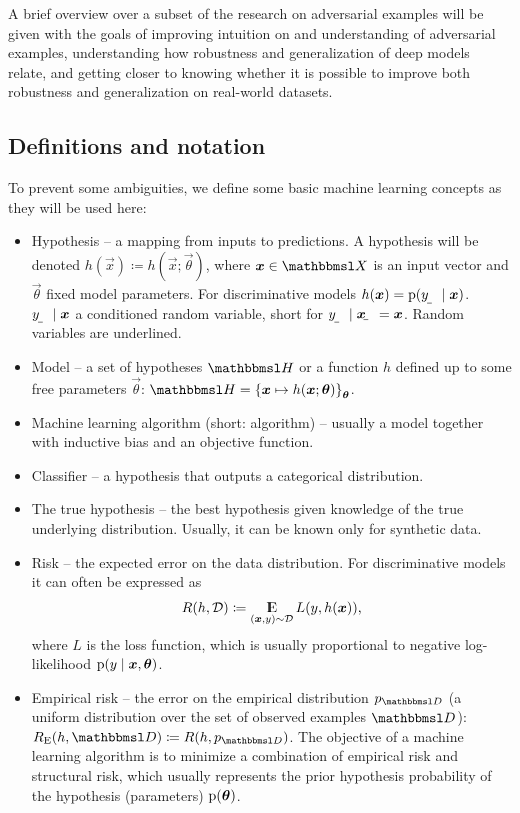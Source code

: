 \documentclass{article}
\begin{document}
A brief overview over a subset of the research on adversarial examples will be given with the goals of improving intuition on and understanding of adversarial examples, understanding how robustness and generalization of deep models relate, and getting closer to knowing whether it is possible to improve both robustness and generalization on real-world datasets. 


\subsection{Definitions and notation}

To prevent some ambiguities, we define some basic machine learning concepts as they will be used here:
\begin{itemize}
	\item Hypothesis -- a mapping from inputs to predictions. A hypothesis will be denoted $h(\vec x)\coloneqq h(\vec x;\vec\theta)$, where $\vec x\in\set X$ is an input vector and $\vec\theta$ fixed model parameters. For discriminative models $h(\vec x)=\p(\rvar y\mid\vec x)$. $\rvar y\mid\vec x$ a conditioned random variable, short for $\rvar y\mid\rvec x=\vec x$. Random variables are underlined.
	\item Model -- a set of hypotheses $\set H$ or a function $h$ defined up to some free parameters $\vec\theta$: $\set H=\cbr{\vec x\mapsto h(\vec x;\vec\theta)}_{\vec\theta}$.
	\item Machine learning algorithm (short: algorithm) -- usually a model together with inductive bias and an objective function. %
	\item Classifier -- a hypothesis that outputs a categorical distribution.
	\item The true hypothesis -- the best hypothesis given knowledge of the true underlying distribution. Usually, it can be known only for synthetic data.
	\item Risk -- the expected error on the data distribution. For discriminative models it can often be expressed as
	\begin{align}
		R(h,\distrib D)\coloneqq\E_{(\vec x,y)\sim\distrib D}L(y, h(\vec x)) \text{,}
	\end{align} where $L$ is the loss function, which is usually proportional to negative log-likelihood $\p(y\mid\vec x,\vec\theta)$.
	\item Empirical risk -- the error on the empirical distribution $p_{\set D}$ (a uniform distribution over the set of observed examples $\set D$): $R_\text{E}(h,\set D)\coloneqq R(h,p_{\set D})$. The objective of a machine learning algorithm is to minimize a combination of empirical risk and structural risk, which usually represents the prior hypothesis probability of the hypothesis (parameters) $\p(\vec\theta)$.
\end{itemize}
\end{document}
